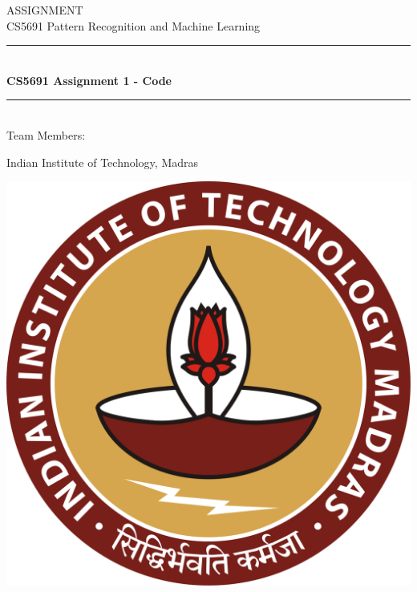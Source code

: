\documentclass[12pt,a4paper]{article}
\begin{document}
	\begin{titlepage} 
		\begin{center}
		\large{ASSIGNMENT}\\
		\vspace{2em}
		\large {CS5691 Pattern Recognition and Machine Learning}
		\vspace{3em}
		
		\rule{0.9\linewidth}{0.5mm} \\[0.4cm]
	    {\Large{\bfseries{CS5691 Assignment 1 - Code}}} \\
	    \rule{0.9\linewidth}{0.5mm} \\[3 em]	
	    
	    Team Members: \\
	    \vspace{0.5em}
	   	

		\vspace{1em}

		Indian Institute of Technology, Madras\\    
		
		\vspace{5em}    
	    
	    	\includegraphics[scale = 0.09]{images/iitmlogo.png}
		\end{center}
	\end{titlepage}
\end{document}
